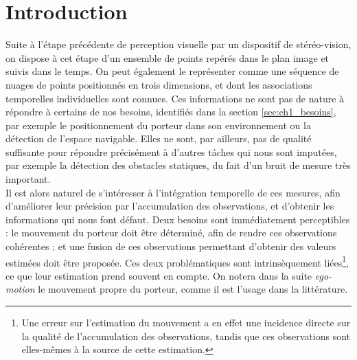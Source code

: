 \vspace{10pt}

\minitoc
\clearpage


\section{Introduction}
Suite à l'étape précédente de perception visuelle par un dispositif de stéréo-vision, on dispose à cet étape d'un ensemble de points repérés dans le plan image et suivis dans le temps. On peut également le représenter comme une séquence de nuages de points positionnés en trois dimensions, et dont les associations temporelles individuelles sont connues. Ces informations ne sont pas de nature à répondre à certains de nos besoins, identifiés dans la section \ref{sec:ch1_besoins}, par exemple le positionnement du porteur dans son environnement ou la détection de l'espace navigable. Elles ne sont, par ailleurs, pas de qualité suffisante pour répondre précisément à d'autres tâches qui nous sont imputées, par exemple la détection des obstacles statiques, du fait d'un bruit de mesure très important.\\
Il est alors naturel de s'intéresser à l'intégration temporelle de ces mesures, afin d'améliorer leur précision par l'accumulation des observations, et d'obtenir les informations qui nous font défaut. Deux besoins sont immédiatement perceptibles : le mouvement du porteur doit être déterminé, afin de rendre ces observations cohérentes ; et une fusion de ces observations permettant d'obtenir des valeurs estimées doit être proposée. Ces deux problématiques sont intrinsèquement liées\footnote{Une erreur sur l'estimation du mouvement a en effet une incidence directe sur la qualité de l'accumulation des observations, tandis que ces observations sont elles-mêmes à la source de cette estimation.}, ce que leur estimation prend souvent en compte. On notera dans la suite \emph{ego-motion} le mouvement propre du porteur, comme il  est l'usage dans la littérature.\\
